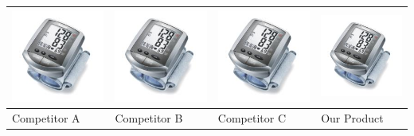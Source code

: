 \documentclass[11pt,a4paper,titlepage]{article}
\begin{document}
\begin{tabular}{| m{92 pt} | m{92 pt} | m{92 pt} | m{92 pt} |}\hline
  \includegraphics[scale=0.40,bb=0 0 150 150]{prod_bpm1.jpg} & 
  \includegraphics[scale=0.40,bb=0 0 150 150]{prod_bpm2.jpg} & 
  \includegraphics[scale=0.40,bb=0 0 150 150]{prod_bpm3.jpg} & 
  \includegraphics[scale=0.40,bb=0 0 150 150]{prod_bpm4.jpg} \\ \hline
  Competitor A & Competitor B & Competitor C & Our Product\\ \hline

\end{tabular}
\end{document}
